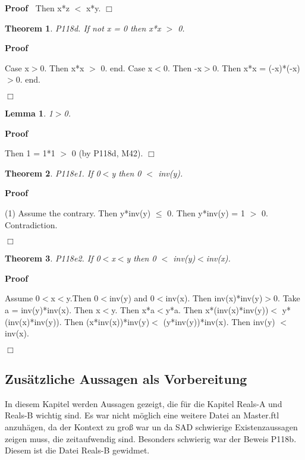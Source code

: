 \documentclass{article}
\newenvironment{forthel}{\begin{leftbar}}{\end{leftbar}}
\newenvironment{proof}{\noindent\textbf{Proof\ }}{\hspace*{\fill}$\Box$\medskip}
\newtheorem{lemma}{Lemma}
\newtheorem{theorem}{Theorem}
\begin{document}
\begin{forthel}
\begin{proof}
	Then x*z $<$ x*y.
	\end{proof}

	
	\begin{theorem}
 P118d. If not x = 0 then x*x $>$ 0.
\end{theorem}	\begin{proof}

	Case x$>$0. Then x*x $>$ 0.
	end.
	Case x$<$0. Then -x$>$0. Then x*x = (-x)*(-x)$>$0.
	end.
	
	\end{proof}

	\begin{lemma} 1$>$0. 

\end{lemma}
	\begin{proof}

	Then 1 = 1*1 $>$ 0 (by P118d, M42).
	\end{proof}

	
	\begin{theorem}
 P118e1. If 0$<$y then 0 $<$ inv(y).
\end{theorem}	\begin{proof}

	(1) Assume the contrary.
	Then y*inv(y) $\leq$ 0.
	Then y*inv(y) = 1 $>$ 0.
	Contradiction.
	
	\end{proof}

	\begin{theorem}
 P118e2. If 0$<$x$<$y then 0 $<$ inv(y)$<$inv(x).
\end{theorem}	\begin{proof}
 
	Assume 0$<$x$<$y.Then 0$<$inv(y) and 0$<$inv(x).
	Then inv(x)*inv(y)$>$0.
	Take a = inv(y)*inv(x).	
	Then x$<$y. Then x*a$<$y*a.
	Then x*(inv(x)*inv(y))$<$ y*(inv(x)*inv(y)).
	Then (x*inv(x))*inv(y)$<$ (y*inv(y))*inv(x).
	Then inv(y) $<$ inv(x).
	
	\end{proof}

	

\end{forthel}








\subsection{Zusätzliche Aussagen als Vorbereitung}
In diesem Kapitel werden Aussagen gezeigt, die für die Kapitel Reals-A und Reals-B wichtig sind.
Es war nicht möglich eine weitere Datei an Master.ftl anzuhägen, da der Kontext zu groß war
un da SAD schwierige Existenzaussagen zeigen muss, die zeitaufwendig sind. Besonders schwierig war der Beweis P118b. Diesem ist die Datei Reals-B gewidmet.
 
\end{document}
